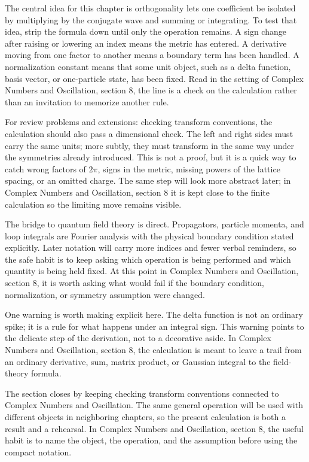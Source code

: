 The central idea for this chapter is orthogonality lets one coefficient be isolated by multiplying by the conjugate wave and summing or integrating.  To test that idea, strip the formula down until only the operation remains.  A sign change after raising or lowering an index means the metric has entered.  A derivative moving from one factor to another means a boundary term has been handled.  A normalization constant means that some unit object, such as a delta function, basis vector, or one-particle state, has been fixed.  Read in the setting of Complex Numbers and Oscillation, section 8, the line is a check on the calculation rather than an invitation to memorize another rule.

For review problems and extensions: checking transform conventions, the calculation should also pass a dimensional check.  The left and right sides must carry the same units; more subtly, they must transform in the same way under the symmetries already introduced.  This is not a proof, but it is a quick way to catch wrong factors of \(2\pi\), signs in the metric, missing powers of the lattice spacing, or an omitted charge.  The same step will look more abstract later; in Complex Numbers and Oscillation, section 8 it is kept close to the finite calculation so the limiting move remains visible.

The bridge to quantum field theory is direct.  Propagators, particle momenta, and loop integrals are Fourier analysis with the physical boundary condition stated explicitly.  Later notation will carry more indices and fewer verbal reminders, so the safe habit is to keep asking which operation is being performed and which quantity is being held fixed.  At this point in Complex Numbers and Oscillation, section 8, it is worth asking what would fail if the boundary condition, normalization, or symmetry assumption were changed.

One warning is worth making explicit here.  The delta function is not an ordinary spike; it is a rule for what happens under an integral sign.  This warning points to the delicate step of the derivation, not to a decorative aside.  In Complex Numbers and Oscillation, section 8, the calculation is meant to leave a trail from an ordinary derivative, sum, matrix product, or Gaussian integral to the field-theory formula.

The section closes by keeping checking transform conventions connected to Complex Numbers and Oscillation.  The same general operation will be used with different objects in neighboring chapters, so the present calculation is both a result and a rehearsal.  In Complex Numbers and Oscillation, section 8, the useful habit is to name the object, the operation, and the assumption before using the compact notation.



